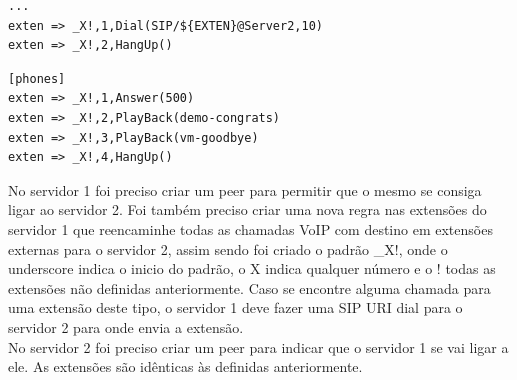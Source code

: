 \documentclass[11pt,a4paper]{report}
\begin{document}
\begin{lstlisting}[caption=SIP Proxy 1 - /etc/asterisk/extensions.conf]
...
exten => _X!,1,Dial(SIP/${EXTEN}@Server2,10)
exten => _X!,2,HangUp()
\end{lstlisting}

\begin{lstlisting}[caption=SIP Proxy 2 - /etc/asterisk/extensions.conf]
[phones]
exten => _X!,1,Answer(500)
exten => _X!,2,PlayBack(demo-congrats)
exten => _X!,3,PlayBack(vm-goodbye)
exten => _X!,4,HangUp()
\end{lstlisting}

No servidor 1 foi preciso criar um peer para permitir que o mesmo se consiga ligar ao servidor 2. Foi também preciso criar uma nova regra nas extensões do servidor 1 que reencaminhe todas as chamadas VoIP com destino em extensões externas para o servidor 2, assim sendo foi criado o padrão \_X!, onde o underscore indica o inicio do padrão, o X indica qualquer número e o ! todas as extensões não definidas anteriormente. Caso se encontre alguma chamada para uma extensão deste tipo, o servidor 1 deve fazer uma SIP URI dial para o servidor 2 para onde envia a extensão.\\
No servidor 2 foi preciso criar um peer para indicar que o servidor 1 se vai ligar a ele. As extensões são idênticas às definidas anteriormente.

\listoffigures
\lstlistoflistings


\end{document}
